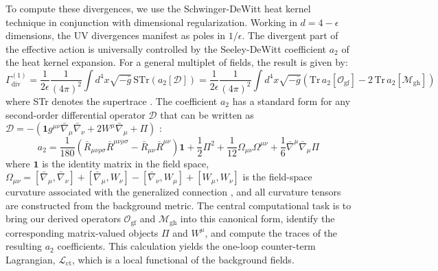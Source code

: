 \documentclass[twocolumn]{aastex631}
\begin{document}
To compute these divergences, we use the Schwinger-DeWitt heat kernel technique \citep{gusev2008heatkernelexpansioncovariant,barvinsky2025schwingerdewittexpansionheatkernel} in conjunction with dimensional regularization. Working in $d=4-\epsilon$ dimensions, the UV divergences manifest as poles in $1/\epsilon$. The divergent part of the effective action is universally controlled by the Seeley-DeWitt coefficient $a_2$ \citep{sauro2025heatkernelnonminimalsecondorder,barvinsky2025functorialpropertiesschwingerdewittexpansion} of the heat kernel expansion. For a general multiplet of fields, the result is given by:
\begin{equation}\Gamma^{(1)}_{\text{div}} = \frac{1}{2\epsilon} \frac{1}{(4\pi)^2} \int d^4x \sqrt{-\bar{g}} \, \text{STr} \left( a_2[\mathcal{D}] \right) = \frac{1}{2\epsilon} \frac{1}{(4\pi)^2} \int d^4x \sqrt{-\bar{g}} \left( \text{Tr} \, a_2[\mathbf{\mathcal{O}}_{\text{gf}}] - 2 \, \text{Tr} \, a_2[\mathcal{M}_{\text{gh}}] \right)\end{equation}
where STr denotes the supertrace \citep{cho2003superfieldformalismloopeffective}. The coefficient $a_2$ has a standard form for any second-order differential operator $\mathcal{D}$ that can be written as $\mathcal{D} = -(\mathbf{1} g^{\mu\nu}\bar{\nabla}_\mu\bar{\nabla}_\nu + 2W^\mu\bar{\nabla}_\mu + \Pi)$ \citep{boroojerdian2020geometricstructuresdifferentialoperators}:
\begin{equation}a_2 = \frac{1}{180} (\bar{R}_{\mu\nu\rho\sigma}\bar{R}^{\mu\nu\rho\sigma} - \bar{R}_{\mu\nu}\bar{R}^{\mu\nu}) \mathbf{1} + \frac{1}{2} \Pi^2 + \frac{1}{12} \Omega_{\mu\nu}\Omega^{\mu\nu} + \frac{1}{6} \bar{\nabla}^\mu\bar{\nabla}_\mu \Pi\end{equation}
where $\mathbf{1}$ is the identity matrix in the field space, $\Omega_{\mu\nu} = [\bar{\nabla}_\mu, \bar{\nabla}_\nu] + [\bar{\nabla}_\mu, W_\nu] - [\bar{\nabla}_\nu, W_\mu] + [W_\mu, W_\nu]$ is the field-space curvature associated with the generalized connection \citep{gong2012covariantapproachgeneralfield}, and all curvature tensors are constructed from the background metric. The central computational task is to bring our derived operators $\mathbf{\mathcal{O}}_{\text{gf}}$ and $\mathcal{M}_{\text{gh}}$ into this canonical form, identify the corresponding matrix-valued objects $\Pi$ and $W^\mu$, and compute the traces of the resulting $a_2$ coefficients. This calculation yields the one-loop counter-term Lagrangian, $\mathcal{L}_{\text{ct}}$, which is a local functional of the background fields.
\end{document}
